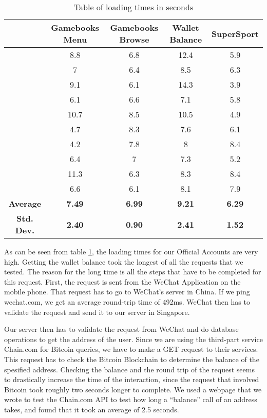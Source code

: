 \begin{table}
	\begin{center}
		\begin{tabular}	{ | c| c | c | c| c|}
		\hline
		 &Gamebooks Menu & Gamebooks Browse & Wallet Balance & SuperSport\\ \hline
		 	& 8.8 & 6.8 & 12.4 & 5.9 \\ \hline
			& 7 & 6.4 & 8.5 & 6.3 \\ \hline
			& 9.1 & 6.1 & 14.3 & 3.9 \\ \hline
			& 6.1 & 6.6 & 7.1 & 5.8 \\ \hline
			& 10.7 & 8.5 & 10.5 & 4.9 \\ \hline
			& 4.7 & 8.3 & 7.6 & 6.1 \\ \hline
			& 4.2 & 7.8 & 8 & 8.4 \\ \hline
			& 6.4 & 7 & 7.3 & 5.2 \\ \hline
			& 11.3 & 6.3 & 8.3 & 8.4 \\ \hline
			& 6.6 & 6.1 & 8.1 & 7.9 \\ \hline 
			\textbf{Average} & \textbf{7.49} & \textbf{6.99} &  \textbf{9.21} & \textbf{6.29}\\ \hline
			\textbf{Std. Dev.} & \textbf{2.40} & \textbf{0.90} & \textbf{2.41} & \textbf{1.52} \\ \hline
		
		
		\end{tabular}
		\caption{Table of loading times in seconds} 
		\label{tbl:loading_times}
	\end{center}
\end{table}

As can be seen from table \ref{tbl:loading_times}, the loading times for our Official Accounts are very high. Getting the wallet balance took the longest of all the requests that we tested. The reason for the long time is all the steps that have to be completed for this request. First, the request is sent from the WeChat Application on the mobile phone. That request has to go to WeChat's server in China. If we ping wechat.com, we get an average round-trip time of 492ms. WeChat then has to validate the request and send it to our server in Singapore. 

Our server then has to validate the request from WeChat and do database operations to get the address of the user. Since we are using the third-part service Chain.com for Bitcoin queries, we have to make a GET request to their services. This request has to check the Bitcoin Blockchain to determine the balance of the spesified address. Checking the balance and the round trip of the request seems to drastically increase the time of the interaction, since the request that involved Bitcoin took roughly two seconds longer to complete. We used a webpage that we wrote to test the Chain.com API to test how long a ``balance'' call of an address takes, and found that it took an average of 2.5 seconds.

